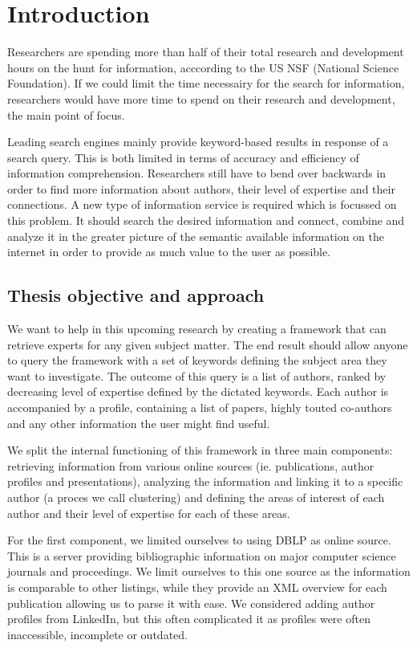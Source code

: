 \chapter{Introduction}

Researchers are spending more than half of their total research and development hours on the hunt for information, acccording to the US NSF (National Science Foundation). If we could limit the time necessairy for the search for information, researchers would have more time to spend on their research and development, the main point of focus.

Leading search engines mainly provide keyword-based results in response of a search query. This is both limited in terms of accuracy and efficiency of information comprehension. Researchers still have to bend over backwards in order to find more information about authors, their level of expertise and their connections. A new type of information service is required which is focussed on this problem. It should search the desired information and connect, combine and analyze it in the greater picture of the semantic available information on the internet in order to provide as much value to the user as possible.


\section{Thesis objective and approach}

We want to help in this upcoming research by creating a framework that can retrieve experts for any given subject matter. The end result should allow anyone to query the framework with a set of keywords defining the subject area they want to investigate. The outcome of this query is a list of authors, ranked by decreasing level of expertise defined by the dictated keywords. Each author is accompanied by a profile, containing a list of papers, highly touted co-authors and any other information the user might find useful.

We split the internal functioning of this framework in three main components: retrieving information from various online sources (ie. publications, author profiles and presentations), analyzing the information and linking it to a specific author (a proces we call clustering) and defining the areas of interest of each author and their level of expertise for each of these areas.

For the first component, we limited ourselves to using DBLP \cite{dblp} as online source. This is a server providing bibliographic information on major computer science journals and proceedings. We limit ourselves to this one source as the information is comparable to other listings, while they provide an XML overview for each publication allowing us to parse it with ease. We considered adding author profiles from LinkedIn, but this often complicated it as profiles were often inaccessible, incomplete or outdated.

